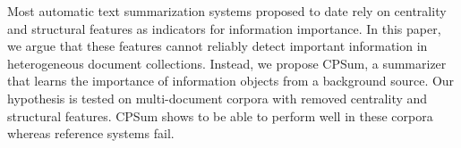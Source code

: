 Most automatic text summarization systems proposed to date rely on centrality and structural features as indicators for information importance. In this paper, we argue that these features cannot reliably detect important information in heterogeneous document collections. Instead, we propose CPSum, a summarizer that learns the importance of information objects from a background source. Our hypothesis is tested on multi-document corpora with removed centrality and structural features. CPSum shows to be able to perform well in these corpora whereas reference systems fail.
